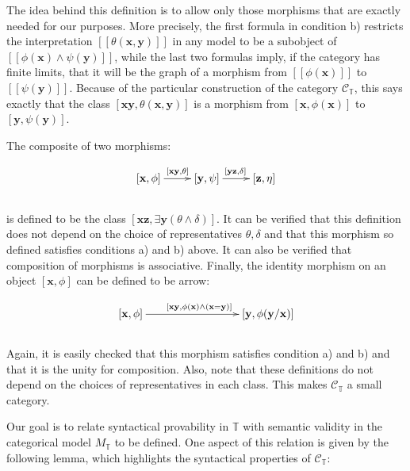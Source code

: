 \documentclass[a4paper,11pt]{article}
\theoremstyle{plain}
\theoremstyle{plain}
\theoremstyle{remark}
\newcommand{\theory}{\ensuremath{\mathbb{T}}}
\begin{document}
The idea behind this definition is to allow only those morphisms that are exactly needed for our purposes. More precisely, the first formula in condition b) restricts the interpretation $[\![\theta(\mathbf{x}, \mathbf{y})]\!]$ in any model to be a subobject of $[\![\phi(\mathbf{x}) \wedge \psi(\mathbf{y})]\!]$, while the last two formulas imply, if the category has finite limits, that it will be the graph of a morphism from $[\![\phi(\mathbf{x})]\!]$ to $[\![\psi(\mathbf{y})]\!]$. Because of the particular construction of the category $\mathcal{C}_{\theory}$, this says exactly that the class $[\mathbf{x} \mathbf{y}, \theta(\mathbf{x}, \mathbf{y})]$ is a morphism from $[\mathbf{x}, \phi(\mathbf{x})]$ to $[\mathbf{y}, \psi(\mathbf{y})]$.

The composite of two morphisms:

\begin{displaymath}
\xymatrix{
[\mathbf{x}, \phi] \ar@{->}[r]^{[\mathbf{x}\mathbf{y},\theta]} & [\mathbf{y}, \psi] \ar@{->}[r]^{[\mathbf{y}\mathbf{z},\delta]} & [\mathbf{z}, \eta]\\
}
\end{displaymath}
\\
is defined to be the class $[\mathbf{x}\mathbf{z}, \exists \mathbf{y} (\theta \wedge \delta)]$. It can be verified that this definition does not depend on the choice of representatives $\theta, \delta$ and that this morphism so defined satisfies conditions a) and b) above. It can also be verified that composition of morphisms is associative. Finally, the identity morphism on an object $[\mathbf{x}, \phi]$ can be defined to be arrow:

\begin{displaymath}
\xymatrix{
[\mathbf{x}, \phi] \ar@{->}[rrr]^{[\mathbf{x} \mathbf{y}, \phi(\mathbf{x}) \wedge (\mathbf{x}=\mathbf{y})]} & & & [\mathbf{y}, \phi(\mathbf{y}/\mathbf{x})]\\
}
\end{displaymath}
\\
Again, it is easily checked that this morphism satisfies condition a) and b) and that it is the unity for composition. Also, note that these definitions do not depend on the choices of representatives in each class. This makes $\mathcal{C}_{\theory}$ a small category.

Our goal is to relate syntactical provability in $\theory$ with semantic validity in the categorical model $M_{\theory}$ to be defined. One aspect of this relation is given by the following lemma, which highlights the syntactical properties of $\mathcal{C}_{\theory}$:
\end{document}
